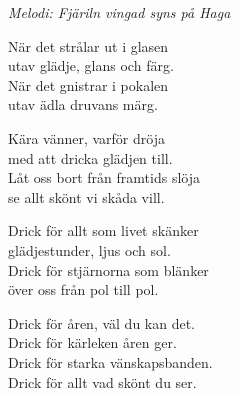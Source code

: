 {\footnotesize\textit{Melodi: Fjäriln vingad syns på Haga}}\par
\vspace{10pt}
När det strålar ut i glasen\\
utav glädje, glans och färg.\\
När det gnistrar i pokalen\\
utav ädla druvans märg.\par
\vspace{10pt}
Kära vänner, varför dröja\\
med att dricka glädjen till.\\
Låt oss bort från framtids slöja\\
se allt skönt vi skåda vill.\par
\vspace{10pt}
Drick för allt som livet skänker\\
glädjestunder, ljus och sol.\\
Drick för stjärnorna som blänker\\
över oss från pol till pol.\par
\vspace{10pt}
Drick för åren, väl du kan det.\\
Drick för kärleken åren ger.\\
Drick för starka vänskapsbanden.\\
Drick för allt vad skönt du ser.
